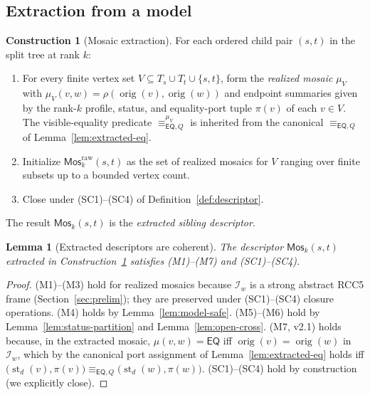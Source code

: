 \documentclass[11pt]{article}
\newtheorem{lemma}[theorem]{Lemma}
\theoremstyle{definition}
\newtheorem{construction}[theorem]{Construction}
\theoremstyle{remark}
\newcommand{\EQ}{\mathsf{EQ}}
\newcommand{\st}{\operatorname{st}}
\newcommand{\orig}{\operatorname{orig}}
\newcommand{\Mos}{\mathsf{Mos}}
\newcommand{\eqQ}{\equiv_{\EQ,Q}}
\begin{document}
\subsection{Extraction from a model}

\begin{construction}[Mosaic extraction]\label{con:mosaic-extract}
For each ordered child pair $(s,t)$ in the split tree at rank $k$:

\begin{enumerate}
\item For every finite vertex set $V \subseteq T_s \cup T_t \cup
  \{s,t\}$, form the \emph{realized mosaic} $\mu_V$ with $\mu_V(v,w)
  = \rho(\orig(v),\orig(w))$ and endpoint summaries given by the
  rank-$k$ profile, status, and equality-port tuple $\pi(v)$ of each
  $v\in V$.  The visible-equality predicate $\eqQ^{\mu_V}$ is
  inherited from the canonical $\eqQ$ of
  Lemma~\ref{lem:extracted-eq}.
\item Initialize $\Mos_k^{\mathrm{raw}}(s,t)$ as the set of
  realized mosaics for $V$ ranging over finite subsets up to a
  bounded vertex count.
\item Close under (SC1)--(SC4) of Definition~\ref{def:descriptor}.
\end{enumerate}
The result $\Mos_k(s,t)$ is the \emph{extracted sibling descriptor}.
\end{construction}

\begin{lemma}[Extracted descriptors are coherent]
\label{lem:descriptor-coherent}
The descriptor $\Mos_k(s,t)$ extracted in
Construction~\ref{con:mosaic-extract} satisfies (M1)--(M7) and
(SC1)--(SC4).
\end{lemma}

\begin{proof}
(M1)--(M3) hold for realized mosaics because $\mathcal{I}_w$ is a
strong abstract RCC5 frame (Section~\ref{sec:prelim}); they are
preserved under (SC1)--(SC4) closure operations.  (M4) holds by
Lemma~\ref{lem:model-safe}.  (M5)--(M6) hold by
Lemma~\ref{lem:status-partition} and Lemma~\ref{lem:open-cross}.
(M7, v2.1) holds because, in the extracted mosaic, $\mu(v,w) = \EQ$
iff $\orig(v) = \orig(w)$ in $\mathcal{I}_w$, which by the canonical
port assignment of Lemma~\ref{lem:extracted-eq} holds iff
$\bigl(\st_d(v),\pi(v)\bigr)\eqQ\bigl(\st_d(w),\pi(w)\bigr)$.
(SC1)--(SC4) hold by construction (we explicitly close).
\end{proof}


\end{document}
